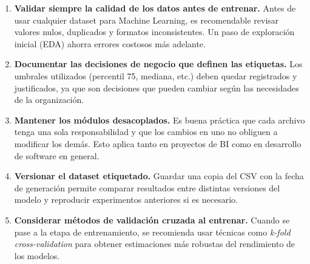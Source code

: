 \documentclass[12pt,a4paper]{article}
\begin{document}
\begin{enumerate}[leftmargin=*, label=\textbf{\arabic*.}]

  \item \textbf{Validar siempre la calidad de los datos antes de entrenar.}
        Antes de usar cualquier dataset para Machine Learning, es recomendable
        revisar valores nulos, duplicados y formatos inconsistentes. Un paso
        de exploraci\'on inicial (EDA) ahorra errores costosos m\'as adelante.

  \item \textbf{Documentar las decisiones de negocio que definen las etiquetas.}
        Los umbrales utilizados (percentil 75, mediana, etc.) deben quedar
        registrados y justificados, ya que son decisiones que pueden cambiar
        seg\'un las necesidades de la organizaci\'on.

  \item \textbf{Mantener los m\'odulos desacoplados.}
        Es buena pr\'actica que cada archivo tenga una sola responsabilidad
        y que los cambios en uno no obliguen a modificar los dem\'as.
        Esto aplica tanto en proyectos de BI como en desarrollo de software
        en general.

  \item \textbf{Versionar el dataset etiquetado.}
        Guardar una copia del CSV con la fecha de generaci\'on permite
        comparar resultados entre distintas versiones del modelo y reproducir
        experimentos anteriores si es necesario.

  \item \textbf{Considerar m\'etodos de validaci\'on cruzada al entrenar.}
        Cuando se pase a la etapa de entrenamiento, se recomienda usar
        t\'ecnicas como \textit{k-fold cross-validation} para obtener
        estimaciones m\'as robustas del rendimiento de los modelos.

\end{enumerate}
\end{document}
